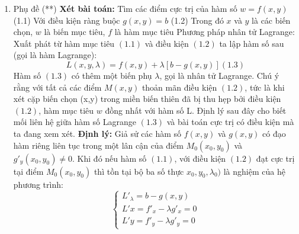 \documentclass{article}
\begin{document}
\begin{enumerate}
        
        \item Phụ đề (**) \newline 
        \textbf{Xét bài toán: }
        Tìm các điểm cực trị của hàm số $w = f(x,y)$ (1.1)\newline 
        Với điều kiện ràng buộc $g(x,y) = b$ (1.2)\newline 
        Trong đó $x$ và $y$ là các biến chọn, $w$ là biến mục tiêu, $f$ là hàm mục tiêu \newline 
        Phương pháp nhân tử Lagrange: \newline 
        Xuất phát từ hàm mục tiêu $(1.1)$ và điều kiện $(1.2)$ ta lập hàm số sau (gọi là hàm
        Lagrange):
        $$L(x,y,\lambda) = f(x,y) + \lambda [b - g(x,y)] (1.3)$$
        Hàm số $(1.3)$ có thêm một biến phụ $\lambda$, gọi là nhân tử Lagrange. Chú ý rằng với 
        tất cả các điểm $M(x,y)$ thoản mãn điều kiện $(1.2)$, tức là khi xét cặp biến chọn (x,y) trong miền biến
        thiên đã bị thu hẹp bởi điều kiện $(1.2)$, hàm mục tiêu $w$ đồng nhất với hàm số L.
        Định lý sau đây cho biết mối liên hệ giữa hàm số Lagrange $(1.3)$ và bài toán cực trị có điều kiện mà ta
        đang xem xét. \newline 
        \textbf{Định lý: } \newline 
        Giả sử các hàm số $f(x,y)$ và $g(x,y)$ có đạo hàm riêng liên tục trong một lân cận của điểm $M_0(x_0,y_0)$
        và $g'_y(x_0, y_0) \neq 0$. Khi đó nếu hàm số $(1.1)$, với điều kiện $(1.2)$ đạt cực trị tại điểm 
        $M_0(x_0,y_0)$ thì tồn tại bộ ba số thực $x_0, y_0, \lambda_0)$ là nghiệm của hệ phương trình:
        $$
        \left\{\begin{matrix}
            L'_\lambda = b - g(x,y) \\
            L'x = f'_x - \lambda g'_x = 0 \\
            L'y = f'_y - \lambda g'_y = 0
        \end{matrix}\right.$$


\end{enumerate}
\end{document}
